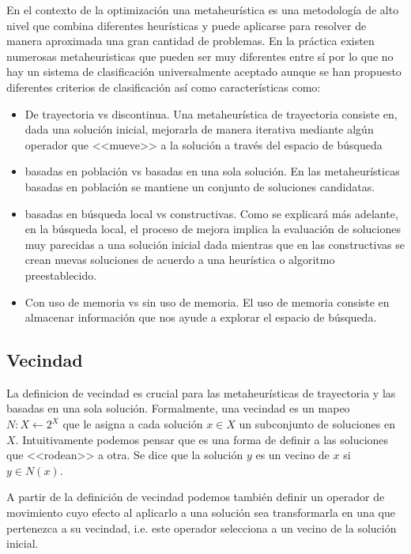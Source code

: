 En el contexto de la optimización una metaheurística es una metodología de alto nivel que combina diferentes heurísticas y puede aplicarse para resolver de manera aproximada una gran cantidad de problemas. En la práctica existen numerosas metaheuristicas que pueden ser muy diferentes entre sí por lo que no hay un sistema de clasificación universalmente aceptado aunque se han propuesto diferentes criterios de clasificación \cite{Stegherr2020} así como características como:
\begin{itemize}
\item De trayectoria vs discontinua. Una metaheurística de trayectoria consiste en, dada una solución inicial, mejorarla de manera iterativa mediante algún operador que <<mueve>> a la solución a través del espacio de búsqueda %
\item basadas en población vs basadas en una sola solución. En las metaheurísticas basadas en población se mantiene un conjunto de soluciones candidatas.
\item basadas en búsqueda local vs constructivas. Como se explicará más adelante, en la búsqueda local, el proceso de mejora implica la evaluación de soluciones muy parecidas a una solución inicial dada mientras que en las constructivas se crean nuevas soluciones de acuerdo a una heurística o algoritmo preestablecido.
\item Con uso de memoria vs sin uso de memoria. El uso de memoria consiste en almacenar información que nos ayude a explorar el espacio de búsqueda.
\end{itemize} 


\subsection{Vecindad}
La definicion de vecindad es crucial para las metaheurísticas de trayectoria y las basadas en una sola solución.
Formalmente, una vecindad es un mapeo $N:X\leftarrow 2^X$ que le asigna a cada solución $x\in X$ un subconjunto de soluciones en $X$. Intuitivamente podemos pensar que es una forma de definir a las soluciones que <<rodean>> a otra. Se dice que la solución $y$ es un vecino de $x$ si $y\in N(x)$.

A partir de la definición de vecindad podemos también definir un operador de movimiento cuyo efecto al aplicarlo a una solución sea transformarla en una que pertenezca a su vecindad, i.e. este operador selecciona a un vecino de la solución inicial.  
 
